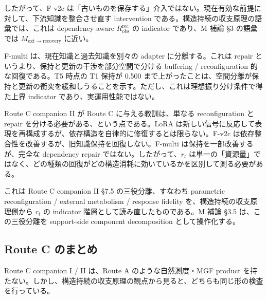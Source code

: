 \documentclass[12pt,a4paper]{article}
\begin{document}
したがって、F-v2c は「古いものを保存する」介入ではない。現在有効な前提に対して、下流知識を整合させ直す intervention である。構造持続の収支原理の語彙では、これは dependency-aware \(R_{\mathrm{obs}}^{\mathrm{rec}}\) の indicator であり、M 補論 §3 の語彙では \(M_{\mathrm{ext}\to\mathrm{recovery}}\) に近い。

F-multi は、現在知識と過去知識を別々の adapter に分離する。これは repair というより、保持と更新の干渉を部分空間で分ける buffering / reconfiguration 的な回復である。T5 時点の T1 保持が 0.500 まで上がったことは、空間分離が保持と更新の衝突を緩和しうることを示す。ただし、これは理想振り分け条件で得た上界 indicator であり、実運用性能ではない。

Route C companion II が Route C に与える教訓は、単なる reconfiguration と repair を分ける必要がある、という点である。LoRA は新しい信号に反応して表現を再構成するが、依存構造を自律的に修復するとは限らない。F-v2c は依存整合性を改善するが、旧知識保持を回復しない。F-multi は保持を一部改善するが、完全な dependency repair ではない。したがって、\(r_{t}\) は単一の「資源量」ではなく、どの種類の回復がどの構造消耗に効いているかを区別して測る必要がある。

これは Route C companion II §7.5 の三役分離、すなわち parametric reconfiguration / external metabolism / response fidelity を、構造持続の収支原理側から \(r_{t}\) の indicator 階層として読み直したものである。M 補論 §3.5 は、この三役分離を support-side component decomposition として操作化する。

\subsection{Route C のまとめ}\label{route-c-ux306eux307eux3068ux3081}

Route C companion I / II は、Route A のような自然測度・MGF product を持たない。しかし、構造持続の収支原理の観点から見ると、どちらも同じ形の検査を行っている。
\end{document}
